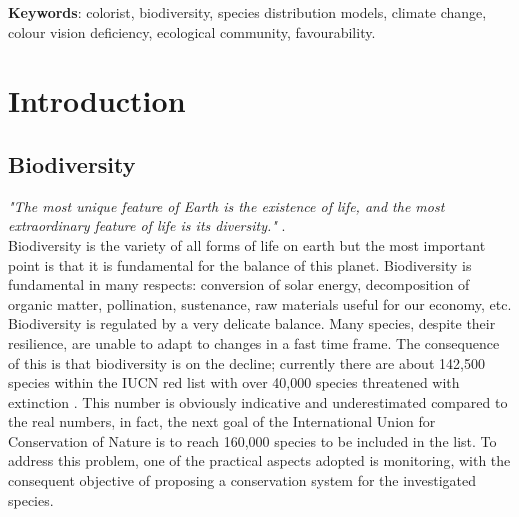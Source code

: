 \documentclass[12pt,a4paper]{article}
\begin{document}
 
\vspace{1cm}
\textbf{Keywords}: colorist, biodiversity, species distribution models, climate change, colour vision deficiency, ecological community, favourability.
\\
\section{Introduction}
\subsection{Biodiversity}
\textit{"The most unique feature of Earth is the existence of life, and the most extraordinary feature of life is its diversity."} \citep{cardinale}.\\
Biodiversity is the variety of all forms of life on earth but the most important point is that it is fundamental for the balance of this planet.
Biodiversity is fundamental in many respects: conversion of solar energy, decomposition of organic matter, pollination, sustenance, raw materials useful for our economy, etc.
Biodiversity is regulated by a very delicate balance.
Many species, despite their resilience, are unable to adapt to changes in a fast time frame.
The consequence of this is that biodiversity is on the decline; currently there are about 142,500 species within the IUCN red list with over 40,000 species threatened with extinction \citep{IUCN}. This number is obviously indicative and underestimated compared to the real numbers, in fact, the next goal of the International Union for Conservation of Nature is to reach 160,000 species to be included in the list.
To address this problem, one of the practical aspects adopted is monitoring, with the consequent objective of proposing a conservation system for the investigated species.
\end{document}
